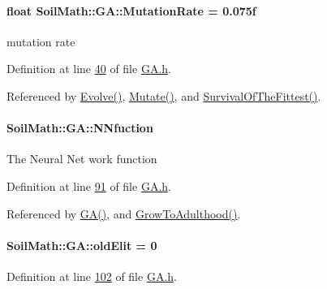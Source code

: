 \paragraph[{Mutation\+Rate}]{\setlength{\rightskip}{0pt plus 5cm}float Soil\+Math\+::\+G\+A\+::\+Mutation\+Rate = 0.\+075f}\label{class_soil_math_1_1_g_a_a82996d544a2f25b5a75ae8ba1e82d661}
mutation rate 

Definition at line \hyperlink{_g_a_8h_source_l00040}{40} of file \hyperlink{_g_a_8h_source}{G\+A.\+h}.



Referenced by \hyperlink{_g_a_8cpp_source_l00023}{Evolve()}, \hyperlink{_g_a_8cpp_source_l00135}{Mutate()}, and \hyperlink{_g_a_8cpp_source_l00189}{Survival\+Of\+The\+Fittest()}.

\hypertarget{class_soil_math_1_1_g_a_a9b690048c89c32e3153457378b5e1c31}{}
\paragraph[{N\+Nfuction}]{ Soil\+Math\+::\+G\+A\+::\+N\+Nfuction\hspace{0.3cm}{\ttfamily [private]}}\label{class_soil_math_1_1_g_a_a9b690048c89c32e3153457378b5e1c31}
The Neural Net work function 

Definition at line \hyperlink{_g_a_8h_source_l00091}{91} of file \hyperlink{_g_a_8h_source}{G\+A.\+h}.



Referenced by \hyperlink{_g_a_8cpp_source_l00013}{G\+A()}, and \hyperlink{_g_a_8cpp_source_l00152}{Grow\+To\+Adulthood()}.

\hypertarget{class_soil_math_1_1_g_a_a9ee328c3a2d3f43b8fccabb06e5ebb18}{}
\paragraph[{old\+Elit}]{ Soil\+Math\+::\+G\+A\+::old\+Elit = 0\hspace{0.3cm}{\ttfamily [private]}}\label{class_soil_math_1_1_g_a_a9ee328c3a2d3f43b8fccabb06e5ebb18}


Definition at line \hyperlink{_g_a_8h_source_l00102}{102} of file \hyperlink{_g_a_8h_source}{G\+A.\+h}.




